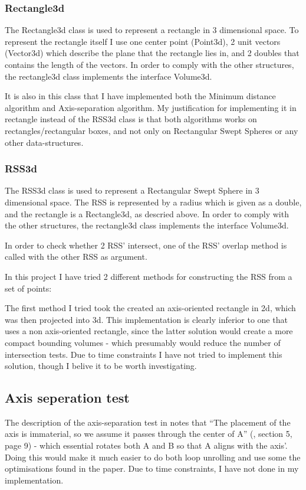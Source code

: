 \subsubsection{Rectangle3d}
\label{rectangle3d}
The Rectangle3d class is used to represent a rectangle in 3 dimensional space. To represent the rectangle itself I use one center point (Point3d), 2 unit vectors (Vector3d) which describe the plane that the rectangle lies in, and 2 doubles that contains the length of the vectors. In order to comply with the other structures, the rectangle3d class implements the interface Volume3d.

It is also in this class that I have implemented both the Minimum distance algorithm and Axis-separation algorithm. My justification for implementing it in rectangle instead of the RSS3d class is that both algorithms works on rectangles/rectangular boxes, and not only on Rectangular Swept Spheres or any other data-structures.

\subsubsection{RSS3d}
\label{RSS3d}
The RSS3d class is used to represent a Rectangular Swept Sphere in 3 dimensional space. The RSS is represented by a radius which is given as a double, and the rectangle is a Rectangle3d, as descried above. In order to comply with the other structures, the rectangle3d class implements the interface Volume3d.

In order to check whether 2 RSS' intersect, one of the RSS' overlap method is called with the other RSS as argument.

In this project I have tried 2 different methods for constructing the RSS from a set of points:

The first method I tried took the created an axis-oriented rectangle in 2d, which was then projected into 3d. This implementation is clearly inferior to one that uses a non axis-oriented rectangle, since the latter solution would create a more compact bounding volumes - which presumably would reduce the number of intersection tests. Due to time constraints I have not tried to implement this solution, though I belive it to be worth investigating. 

\subsection{Axis seperation test}
\label{implementation_axis_sep}
The description of the axis-separation test in \cite{237244} notes that ``The placement of the axis is immaterial, so we assume it passes through the center of A'' (\cite{237244}, section 5, page 9) - which essential rotates both A and B so that A aligns with the axis'. Doing this would make it much easier to do both loop unrolling  and use some the optimisations found in the paper. Due to time constraints, I have not done in my implementation.

